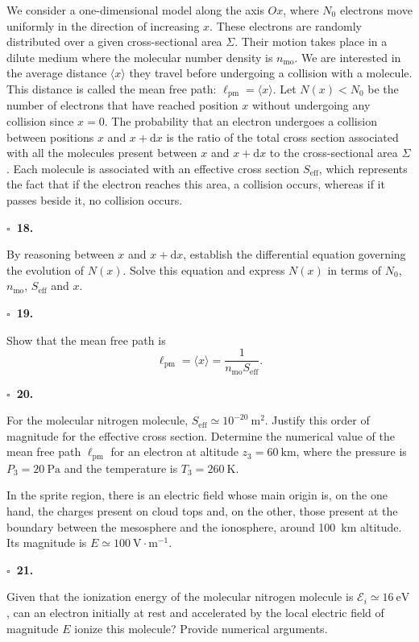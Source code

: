 \documentclass[11pt,a4paper]{article}
\newcommand{\question}[1]{%
  \par\medskip\noindent\textbf{\(\square\)\ #1.}\quad%
}
\begin{document}
We consider a one-dimensional model along the axis \(Ox\), where \(N_0\) electrons move uniformly in the direction of increasing \(x\). These electrons are randomly distributed over a given cross-sectional area \(\Sigma\). Their motion takes place in a dilute medium where the molecular number density is \(n_{\mathrm{mo}}\). We are interested in the average distance \(\langle x\rangle\) they travel before undergoing a collision with a molecule. This distance is called the mean free path: \(\ell_{\mathrm{pm}}=\langle x\rangle\). Let \(N(x)<N_0\) be the number of electrons that have reached position \(x\) without undergoing any collision since \(x=0\). The probability that an electron undergoes a collision between positions \(x\) and \(x+\mathrm{d}x\) is the ratio of the total cross section associated with all the molecules present between \(x\) and \(x+\mathrm{d}x\) to the cross-sectional area \(\Sigma\). Each molecule is associated with an effective cross section \(S_{\mathrm{eff}}\), which represents the fact that if the electron reaches this area, a collision occurs, whereas if it passes beside it, no collision occurs.

\question{18}
By reasoning between \(x\) and \(x+\mathrm{d}x\), establish the differential equation governing the evolution of \(N(x)\). Solve this equation and express \(N(x)\) in terms of \(N_0\), \(n_{\mathrm{mo}}\), \(S_{\mathrm{eff}}\) and \(x\).

\question{19}
Show that the mean free path is
\[
\ell_{\mathrm{pm}}=\langle x\rangle=\frac{1}{n_{\mathrm{mo}}S_{\mathrm{eff}}}.
\]

\question{20}
For the molecular nitrogen molecule, \(S_{\mathrm{eff}}\simeq 10^{-20}~\mathrm{m}^2\). Justify this order of magnitude for the effective cross section. Determine the numerical value of the mean free path \(\ell_{\mathrm{pm}}\) for an electron at altitude \(z_3=60~\mathrm{km}\), where the pressure is \(P_3=20~\mathrm{Pa}\) and the temperature is \(T_3=260~\mathrm{K}\).

In the sprite region, there is an electric field whose main origin is, on the one hand, the charges present on cloud tops and, on the other, those present at the boundary between the mesosphere and the ionosphere, around 100~km altitude. Its magnitude is \(E\simeq 100~\mathrm{V}\cdot\mathrm{m}^{-1}\).

\question{21}
Given that the ionization energy of the molecular nitrogen molecule is \(\mathcal{E}_i\simeq 16~\mathrm{eV}\), can an electron initially at rest and accelerated by the local electric field of magnitude \(E\) ionize this molecule? Provide numerical arguments.
\end{document}
